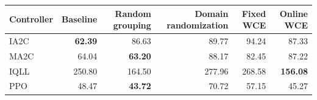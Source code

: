 \begin{tabular}{lrrrrr}
\hline
Controller & Baseline & Random grouping & Domain randomization & Fixed WCE & Online WCE \\
\hline
IA2C & \textbf{62.39} & 86.63 & 89.77 & 94.24 & 87.33 \\
MA2C & 64.04 & \textbf{63.20} & 88.17 & 82.45 & 87.22 \\
IQLL & 250.80 & 164.50 & 277.96 & 268.58 & \textbf{156.08} \\
PPO & 48.47 & \textbf{43.72} & 70.72 & 57.15 & 45.27 \\
\hline
\end{tabular}
